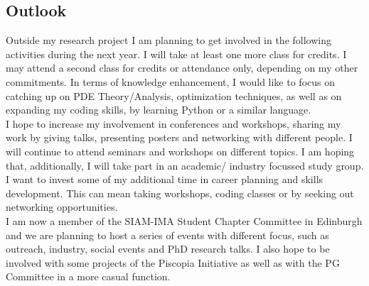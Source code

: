 \documentclass[11pt, a4paper]{article}
\theoremstyle{definition}
\begin{document}
\subsection{Outlook}
Outside my research project I am planning to get involved in the following activities during the next year.
I will take at least one more class for credits. I may attend a second class for credits or attendance only, depending on my other commitments. In terms of knowledge enhancement, I would like to focus on catching up on PDE Theory/Analysis, optimization techniques, as well as on expanding my coding skills, by learning Python or a similar language.\\
I hope to increase my involvement in conferences and workshops, sharing my work by giving talks, presenting posters and networking with different people. I will continue to attend seminars and workshops on different topics. I am hoping that, additionally, I will take part in an academic/ industry focussed study group.\\
I want to invest some of my additional time in career planning and skills development. This can mean taking workshops, coding classes or by seeking out networking opportunities.\\ 	
I am now a member of the SIAM-IMA Student Chapter Committee in Edinburgh and we are planning to host a series of events with different focus, such as outreach, industry, social events and PhD research talks. 
I also hope to be involved with some projects of the Piscopia Initiative as well as with the PG Committee in a more casual function. \\
\end{document}
